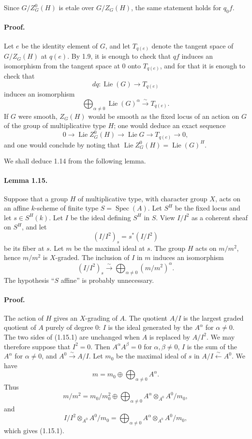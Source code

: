 \documentclass[11pt]{article}
\newcommand{\Lie}{\operatorname{Lie}}
\newcommand{\Spec}{\operatorname{Spec}}
\newcommand{\xiso}{\xrightarrow{\sim}}
\theoremstyle{plain}
\theoremstyle{definition}
\begin{document}
Since $G/Z^0_G(H)$ is etale over $G/Z_G(H)$, the same statement holds for $q_0f$.

\paragraph{Proof.} Let $e$ be the identity element of $G$, and let $T_{q(e)}$ denote the tangent space of $G/Z_G(H)$ at $q(e)$. By 1.9, it is enough to check that $qf$ induces an isomorphism from the tangent space at $0$ onto $T_{q(e)}$, and for that it is enough to check that
\[
   dq:\Lie(G)\longrightarrow T_{q(e)}
\]
induces an isomorphism
\[
   \bigoplus_{\alpha\ne0}\Lie(G)^\alpha\xiso{}T_{q(e)}.
\]
If $G$ were smooth, $Z_G(H)$ would be smooth as the fixed locus of an action on $G$ of the group of multiplicative type $H$; one would deduce an exact sequence
\[
   0\longrightarrow \Lie Z^0_G(H)\longrightarrow \Lie G\longrightarrow T_{q(e)}\longrightarrow0,
\]
and one would conclude by noting that $\Lie Z^0_G(H)=\Lie(G)^H$.

We shall deduce 1.14 from the following lemma.

\paragraph{Lemma 1.15.} Suppose that a group $H$ of multiplicative type, with character group $X$, acts on an affine $k$-scheme of finite type $S=\Spec(A)$. Let $S^H$ be the fixed locus and let $s\in S^H(k)$. Let $I$ be the ideal defining $S^H$ in $S$. View $I/I^2$ as a coherent sheaf on $S^H$, and let
\[
   (I/I^2)_s=s^*(I/I^2)
\]
be its fiber at $s$. Let $m$ be the maximal ideal at $s$. The group $H$ acts on $m/m^2$, hence $m/m^2$ is $X$-graded. The inclusion of $I$ in $m$ induces an isomorphism
\begin{equation}\tag{1.15.1}
   (I/I^2)_s\xiso{}\bigoplus_{\alpha\ne0}(m/m^2)^\alpha.
\end{equation}
The hypothesis ``$S$ affine'' is probably unnecessary.

\paragraph{Proof.} The action of $H$ gives an $X$-grading of $A$. The quotient $A/I$ is the largest graded quotient of $A$ purely of degree $0$: $I$ is the ideal generated by the $A^\alpha$ for $\alpha\ne0$. The two sides of (1.15.1) are unchanged when $A$ is replaced by $A/I^2$. We may therefore suppose that $I^2=0$. Then $A^\alpha A^\beta=0$ for $\alpha,\beta\ne0$, $I$ is the sum of the $A^\alpha$ for $\alpha\ne0$, and $A^0\xiso{}A/I$. Let $m_0$ be the maximal ideal of $s$ in $A/I\xleftarrow{\sim} A^0$. We have
\[
   m=m_0\oplus\bigoplus_{\alpha\ne0} A^\alpha.
\]
Thus
\[
   m/m^2=m_0/m_0^2\oplus\bigoplus_{\alpha\ne0}A^\alpha\otimes_{A^0}A^0/m_0,
\]
and
\[
   I/I^2\otimes_{A^0}A^0/m_0=\bigoplus_{\alpha\ne0}A^\alpha\otimes_{A^0}A^0/m_0,
\]
which gives (1.15.1).
\end{document}
